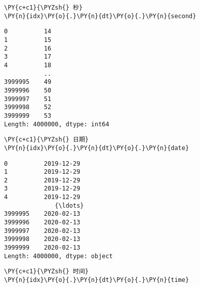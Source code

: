     \begin{tcolorbox}[breakable, size=fbox, boxrule=1pt, pad at break*=1mm,colback=cellbackground, colframe=cellborder]
\begin{Verbatim}[commandchars=\\\{\}]
\PY{c+c1}{\PYZsh{} 秒}
\PY{n}{idx}\PY{o}{.}\PY{n}{dt}\PY{o}{.}\PY{n}{second}
\end{Verbatim}
\end{tcolorbox}

            \begin{tcolorbox}[breakable, size=fbox, boxrule=.5pt, pad at break*=1mm, opacityfill=0]
\begin{Verbatim}[commandchars=\\\{\}]
0          14
1          15
2          16
3          17
4          18
           ..
3999995    49
3999996    50
3999997    51
3999998    52
3999999    53
Length: 4000000, dtype: int64
\end{Verbatim}
\end{tcolorbox}
        
    \begin{tcolorbox}[breakable, size=fbox, boxrule=1pt, pad at break*=1mm,colback=cellbackground, colframe=cellborder]
\begin{Verbatim}[commandchars=\\\{\}]
\PY{c+c1}{\PYZsh{} 日期}
\PY{n}{idx}\PY{o}{.}\PY{n}{dt}\PY{o}{.}\PY{n}{date}
\end{Verbatim}
\end{tcolorbox}

            \begin{tcolorbox}[breakable, size=fbox, boxrule=.5pt, pad at break*=1mm, opacityfill=0]
\begin{Verbatim}[commandchars=\\\{\}]
0          2019-12-29
1          2019-12-29
2          2019-12-29
3          2019-12-29
4          2019-12-29
              {\ldots}
3999995    2020-02-13
3999996    2020-02-13
3999997    2020-02-13
3999998    2020-02-13
3999999    2020-02-13
Length: 4000000, dtype: object
\end{Verbatim}
\end{tcolorbox}
        
    \begin{tcolorbox}[breakable, size=fbox, boxrule=1pt, pad at break*=1mm,colback=cellbackground, colframe=cellborder]
\begin{Verbatim}[commandchars=\\\{\}]
\PY{c+c1}{\PYZsh{} 时间}
\PY{n}{idx}\PY{o}{.}\PY{n}{dt}\PY{o}{.}\PY{n}{time}
\end{Verbatim}
\end{tcolorbox}

